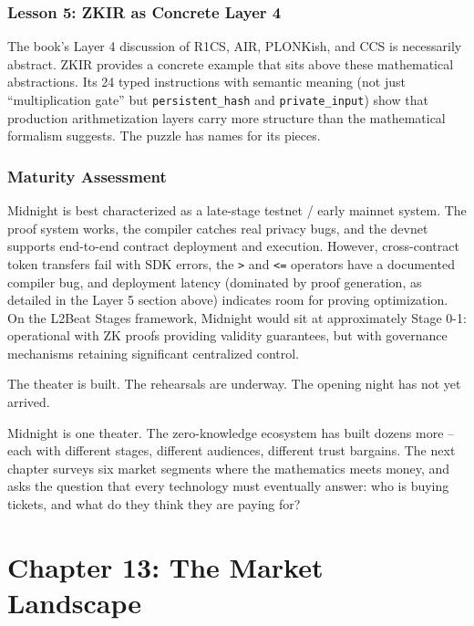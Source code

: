 \documentclass[
  11pt,
  openany]{report}
\begin{document}
\subsection{Lesson 5: ZKIR as Concrete Layer
4}\label{lesson-5-zkir-as-concrete-layer-4}

The book's Layer 4 discussion of R1CS, AIR, PLONKish, and CCS is necessarily
abstract. ZKIR provides a concrete example that sits above these mathematical
abstractions. Its 24 typed instructions with semantic meaning (not just
``multiplication gate'' but \texttt{persistent\_hash} and
\texttt{private\_input}) show that production arithmetization layers carry more
structure than the mathematical formalism suggests. The puzzle has names for its
pieces.

\subsection{Maturity Assessment}\label{maturity-assessment}

Midnight is best characterized as a late-stage testnet / early mainnet system.
The proof system works, the compiler catches real privacy bugs, and the devnet
supports end-to-end contract deployment and execution. However, cross-contract
token transfers fail with SDK errors, the \texttt{\textgreater{}} and
\texttt{\textless{}=} operators have a documented compiler bug, and deployment
latency (dominated by proof generation, as detailed in the Layer 5 section
above) indicates room for proving optimization. On the L2Beat Stages framework,
Midnight would sit at approximately Stage 0-1: operational with ZK proofs
providing validity guarantees, but with governance mechanisms retaining
significant centralized control.

The theater is built. The rehearsals are underway. The opening night has not yet
arrived.

Midnight is one theater. The zero-knowledge ecosystem has built dozens more --
each with different stages, different audiences, different trust bargains. The
next chapter surveys six market segments where the mathematics meets money, and
asks the question that every technology must eventually answer: who is buying
tickets, and what do they think they are paying for?

\chapter{Chapter 13: The Market
Landscape}\label{chapter-13-the-market-landscape}
\end{document}
